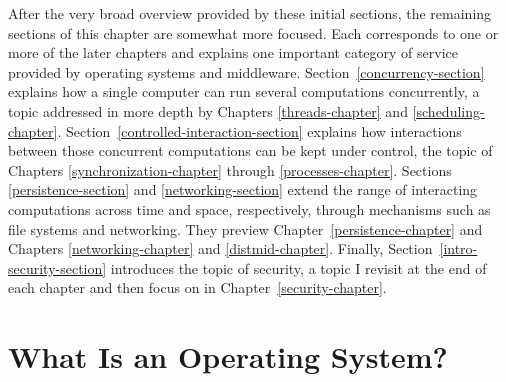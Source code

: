 After the very broad overview provided by these initial sections, the
remaining sections of this chapter are somewhat more focused.  Each
corresponds to one or more of the later chapters and explains one
important category of service provided by operating systems and
middleware.
Section~\ref{concurrency-section} explains how a single computer can
run several computations concurrently, a topic addressed in more depth
by Chapters \ref{threads-chapter} and \ref{scheduling-chapter}.
Section~\ref{controlled-interaction-section} explains how interactions
between those concurrent computations can be kept under control, the
topic of Chapters \ref{synchronization-chapter} through
\ref{processes-chapter}.  Sections \ref{persistence-section} and
\ref{networking-section} extend the range of interacting computations
across time and space, respectively, through mechanisms such as file
systems and networking.  They preview
Chapter~\ref{persistence-chapter} and Chapters
\ref{networking-chapter} and \ref{distmid-chapter}.  Finally,
Section~\ref{intro-security-section} introduces the topic of security,
a topic I revisit at the end of each chapter and then focus on in
Chapter~\ref{security-chapter}.

\section{What Is an Operating System?}\label{what-is-os-section}

